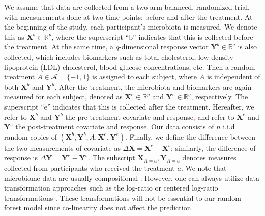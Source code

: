 \documentclass[smallextended]{svjour3}
\newcommand{\bg}[1]{\textcolor{red}{#1}}
\begin{document}
We assume that data are collected from a two-arm balanced, randomized trial, with measurements done at two time-points: before and after the treatment. At the beginning of the study, each participant's microbiota is measured. We denote this as $\bm{X}^b \in \mathbb{R}^p$, where the superscript ``b'' indicates that this is collected before the treatment. At the same time, a $q$-dimensional response vector $\bm{Y}^b \in \mathbb{R}^q$ is also collected, which includes biomarkers such as total cholesterol, low-density lipoprotein (LDL)-cholesterol, blood glucose concentrations, etc. Then a random treatment $A \in \mathcal{A} = \{-1,1\}$ is assigned to each subject, where $A$ is independent of both $\bm{X}^b$ and $\bm{Y}^b$. After the treatment, the microbiota and biomarkers are again measured for each subject, denoted as $\bm X^e \in \mathbb{R}^p$ and $\bm Y^e \in \mathbb{R}^q$, respectively. The superscript ``e'' indicates that this is collected after the treatment. Hereafter, we refer to $\bm X^b$ and $\bm Y^b$ the pre-treatment covariate and response\bg{,} and refer to $\bm X^e$ and $\bm Y^e$ the post-treatment covariate and response. Our data consists of $n$ i.i.d random copies of $(\bm X^b, \bm Y^b, A, \bm X^e, \bm Y^e)$. Finally, we define the difference between the two measurements of covariate as $\Delta \bm X = \bm X^e - \bm X^b$; similarly, the difference of response is $\Delta \bm Y = \bm Y^e - \bm Y^b$. The subscript $ \textbf{X}_{A=a}, \textbf{Y}_{A=a}$ denotes measures collected from participants who received the treatment $a$. We note that microbiome data are usually compositional \citep{li2019statistical}. However, one can always utilize data transformation approaches such as the log-ratio or centered log-ratio transformations \citep{egozcue2003isometric}. These transformations will not be essential to our random forest model since co-linearity does not affect the prediction.
\end{document}
